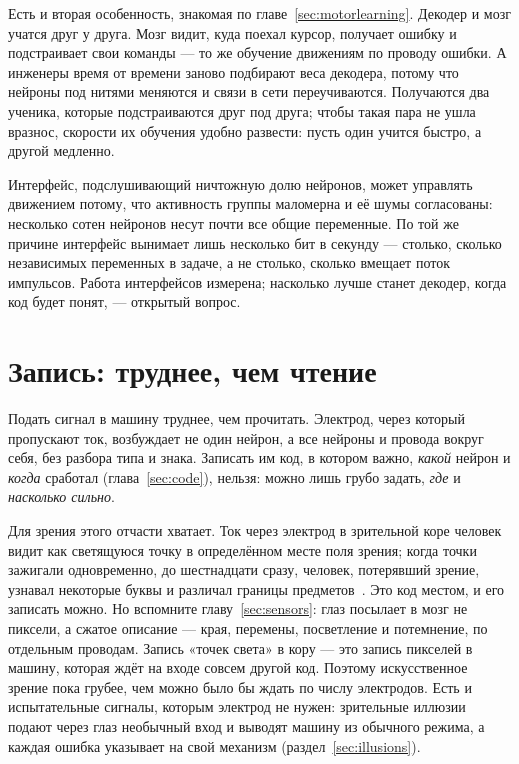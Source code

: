 Есть и вторая особенность, знакомая по главе~\ref{sec:motorlearning}. Декодер и мозг учатся друг у друга. Мозг видит, куда поехал курсор, получает ошибку и подстраивает свои команды --- то же обучение движениям по проводу ошибки. А инженеры время от времени заново подбирают веса декодера, потому что нейроны под нитями меняются и связи в сети переучиваются. Получаются два ученика, которые подстраиваются друг под друга; чтобы такая пара не ушла вразнос, скорости их обучения удобно развести: пусть один учится быстро, а другой медленно.

\begin{keyblock}
\begin{proposition}
\label{prop:probe}
Интерфейс, подслушивающий ничтожную долю нейронов, может управлять движением потому, что активность группы маломерна и её шумы согласованы: несколько сотен нейронов несут почти все общие переменные. По той же причине интерфейс вынимает лишь несколько бит в секунду --- столько, сколько независимых переменных в задаче, а не столько, сколько вмещает поток импульсов. Работа интерфейсов измерена; насколько лучше станет декодер, когда код будет понят, --- открытый вопрос.
\end{proposition}
\end{keyblock}

\section{Запись: труднее, чем чтение}

Подать сигнал в машину труднее, чем прочитать. Электрод, через который пропускают ток, возбуждает не один нейрон, а все нейроны и провода вокруг себя, без разбора типа и знака. Записать им код, в котором важно, \emph{какой} нейрон и \emph{когда} сработал (глава~\ref{sec:code}), нельзя: можно лишь грубо задать, \emph{где} и \emph{насколько сильно}.

Для зрения этого отчасти хватает. Ток через электрод в зрительной коре человек видит как светящуюся точку в определённом месте поля зрения; когда точки зажигали одновременно, до шестнадцати сразу, человек, потерявший зрение, узнавал некоторые буквы и различал границы предметов~\cite{Fernandez2021}. Это код местом, и его записать можно. Но вспомните главу~\ref{sec:sensors}: глаз посылает в мозг не пиксели, а сжатое описание --- края, перемены, посветление и потемнение, по отдельным проводам. Запись «точек света» в кору --- это запись пикселей в машину, которая ждёт на входе совсем другой код. Поэтому искусственное зрение пока грубее, чем можно было бы ждать по числу электродов. Есть и испытательные сигналы, которым электрод не нужен: зрительные иллюзии подают через глаз необычный вход и выводят машину из обычного режима, а каждая ошибка указывает на свой механизм (раздел~\ref{sec:illusions}).

